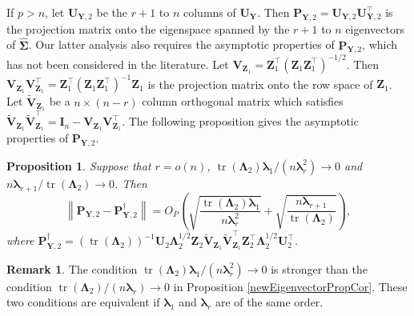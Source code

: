 \documentclass[12pt]{article} %
\DeclareMathOperator{\mytr}{tr}
\newcommand{\bZ}{\mathbf{Z}}
\newcommand{\bP}{\mathbf{P}}
\newcommand{\bY}{\mathbf{Y}}
\newcommand{\bI}{\mathbf{I}}
\newcommand{\bU}{\mathbf{U}}
\newcommand{\bV}{\mathbf{V}}
\newcommand{\bfsym}[1]{\ensuremath{\boldsymbol{#1}}}
\def\blambda {\bfsym {\lambda}}
\def\bLambda {\bfsym {\Lambda}}
\def\bSigma {\bfsym {\Sigma}}
\newtheorem{proposition}{Proposition}
\theoremstyle{definition}
\newtheorem{remark}{Remark}
\begin{document}
If $p>n$, let $\bU_{\bY,2}$ be the $r+1$ to $n$ columns of $\bU_{\bY}$.
Then $\bP_{\bY,2}=\bU_{\bY,2}\bU_{\bY,2}^\top$ is the projection matrix onto the eigenspace spanned by the $r+1$ to $n$ eigenvectors of $\hat{\bSigma}$.
Our latter analysis also requires the asymptotic properties of $\bP_{\bY,2}$, which has not been considered in the literature.
    Let $\bV_{\bZ_1}=\bZ_1^\top (\bZ_1 \bZ_1^\top)^{-1/2}$.
    Then $\bV_{\bZ_1}\bV_{\bZ_1}^\top=\bZ_1^\top (\bZ_1 \bZ_1^\top)^{-1}\bZ_1$ is the projection matrix onto the row space of $\bZ_1$.
    Let $\tilde{\bV}_{\bZ_1}$ be a $n\times (n-r)$ column orthogonal matrix which satisfies $\tilde{\bV}_{\bZ_1}\tilde{\bV}_{\bZ_1}^\top= \bI_{n}-\bV_{\bZ_1}\bV_{\bZ_1}^\top$.
    The following proposition gives the asymptotic properties of $\bP_{\bY,2}$.

\begin{proposition}
    \label{eigenvectorprop3}
    Suppose that $r=o(n)$, $\mytr(\bLambda_2)\blambda_1/(n\blambda_r^2)\to 0$ and $n\blambda_{r+1} /\mytr(\bLambda_2)\to 0$. Then
    \begin{equation*}
            \left\|\bP_{\bY,2}-
            \bP_{\bY,2}^{\dagger}
            \right\|
    = 
    O_P\left(
        \sqrt{\frac{\mytr(\bLambda_2) \blambda_1}{n\blambda_r^2}}
    +
    \sqrt{\frac{n\blambda_{r+1}}{\mytr(\bLambda_2)}}\right),
    \end{equation*}
    where $
            \bP_{\bY,2}^{\dagger}=
            \left(\mytr(\bLambda_2)\right)^{-1}
            \bU_2 \bLambda_2^{1/2}\bZ_{2} \tilde{\bV}_{\bZ_1}
            \tilde{\bV}_{\bZ_1}^\top \bZ_2^\top \bLambda_2^{1/2} \bU_2^\top
            $.
\end{proposition}
\begin{remark}
    The condition $\mytr(\bLambda_2)\blambda_1/(n\blambda_r^2)\to 0$ is stronger than the condition $\mytr(\bLambda_2)/(n\blambda_r)\to 0$ in Proposition \ref{newEigenvectorPropCor}.
    These two conditions are equivalent if $\blambda_1$ and $\blambda_r$ are of the same order.
\end{remark}
\end{document}
